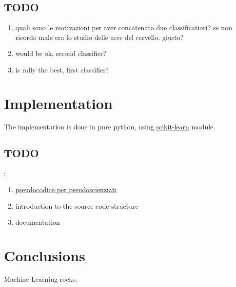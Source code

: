 \documentclass[10pt]{article}
\begin{document}
\subsection{TODO}
\begin{enumerate}
\item quali sono le motivazioni per aver concatenato due classificatiori? se non ricordo male era lo studio delle aree del cervello. giusto?
\item would be ok, second classifier? 
\item is rally the best, first classifier?
\end{enumerate}

\section{Implementation}
The implementation is done in pure python, using \href{http://scikit-learn.org/stable/}{scikit-learn} module. 

\subsection{TODO}:
\begin{enumerate}
\item  \href{https://en.wikibooks.org/wiki/LaTeX/Algorithms_and_Pseudocode}{pseudocodice per pseudoscienziati}
\item introduction to the source code structure
\item documentation
\end{enumerate}



\section{Conclusions}
Machine Learning rocks.
\end{document}
